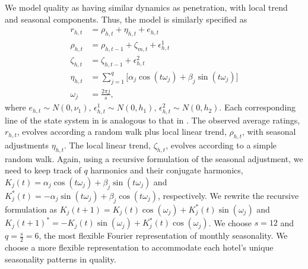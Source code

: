 \documentclass[mksc,blindrev]{informs3} %
\begin{document}
We model quality as having similar dynamics as penetration, with local trend and seasonal components. Thus, the model is similarly specified as 
\begin{equation}\label{eq:ratings_dlm}
\begin{split}
r_{h,t}&=\rho_{h,t}+\eta_{h,t}+e_{h,t}\\
\rho_{h,t}&=\rho_{h,t-1}+\zeta_{m,t}+\epsilon_{h,t}^{1} \\
\zeta_{h,t} &= \zeta_{h,t-1} +\epsilon_{h,t}^{2} \\
\eta_{h,t} &=\sum_{j=1}^{q}\big[\alpha_j\cos(t\omega_j)+\beta_j\sin(t\omega_j)\big] \\
\omega_j &= \frac{2\pi j}{s},
\end{split}
\end{equation}
where $e_{h,t}\sim N(0,\nu_1)\text{, }\epsilon_{h,t}^{1}\sim N(0,h_1)\text{, }\epsilon_{h,t}^{2}\sim N(0,h_2)$. Each corresponding line of the state system in  is analogous to that in . The observed average ratings, $r_{h,t}$, evolves according a random walk plus local linear trend, $\rho_{h,t}$, with seasonal adjustments $\eta_{h,t}$. The local linear trend, $\zeta_{h,t}$, evolves according to a simple random walk. Again, using a recursive formulation of the seasonal adjustment, we need to keep track of $q$ harmonics and their conjugate harmonics, $K_j(t)=\alpha_j\cos(t\omega_j)+\beta_j\sin(t\omega_j)$ and $K_j^{*}(t)=-\alpha_j\sin(t\omega_j)+\beta_j\cos(t\omega_j)$, respectively. We rewrite the recursive formulation as $K_j(t+1)=K_j(t)\cos(\omega_j)+K_j^{*}(t)\sin(\omega_j)$ and $K_j(t+1)^{*}=-K_j(t)\sin(\omega_j)+K_j^{*}(t)\cos(\omega_j)$. We choose $s=12$ and $q=\frac{s}{2}=6$, the most flexible Fourier representation of monthly seasonality. We choose a more flexible representation to accommodate each hotel's unique seasonality patterns in quality. 
\end{document}
